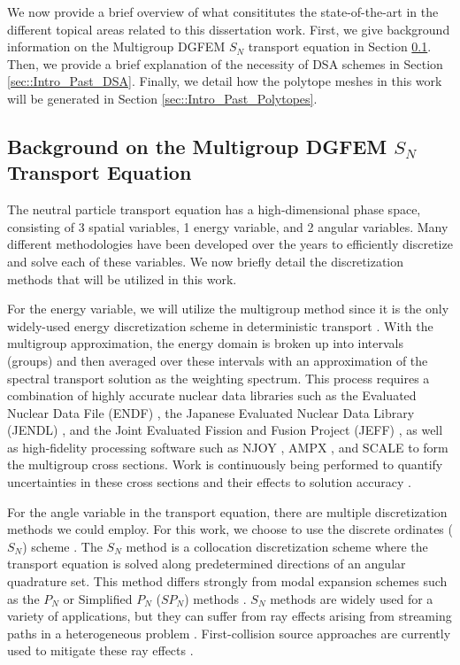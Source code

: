 We now provide a brief overview of what consititutes the state-of-the-art in the different topical areas related to this dissertation work. First, we give background information on the Multigroup DGFEM $S_N$ transport equation in Section \ref{sec::Intro_Past_DGFEMMGSn}. Then, we provide a brief explanation of the necessity of DSA schemes in Section \ref{sec::Intro_Past_DSA}. Finally, we detail how the polytope meshes in this work will be generated in Section \ref{sec::Intro_Past_Polytopes}.

\subsection{Background on the Multigroup DGFEM $S_N$ Transport Equation}
\label{sec::Intro_Past_DGFEMMGSn}

The neutral particle transport equation has a high-dimensional phase space, consisting of 3 spatial variables, 1 energy variable, and 2 angular variables. Many different methodologies have been developed over the years to efficiently discretize and solve each of these variables. We now briefly detail the discretization methods that will be utilized in this work.

For the energy variable, we will utilize the multigroup method since it is the only widely-used energy discretization scheme in deterministic transport \cite{duderstadt1976nuclear,bell1979nuclear}. With the multigroup approximation, the energy domain is broken up into intervals (groups) and then averaged over these intervals with an approximation of the spectral transport solution as the weighting spectrum. This process requires a combination of highly accurate nuclear data libraries such as the Evaluated Nuclear Data File (ENDF) \cite{chadwick2006endf,chadwick2011endf}, the Japanese Evaluated Nuclear Data Library (JENDL) \cite{shibata2002japanese}, and the Joint Evaluated Fission and Fusion Project (JEFF) \cite{koning2006jeff}, as well as high-fidelity processing software such as NJOY \cite{macfarlane2002njoy,kahler2012njoy}, AMPX \cite{dunn2002ampx}, and SCALE \cite{bucholz1982scale} to form the multigroup cross sections. Work is continuously being performed to quantify uncertainties in these cross sections and their effects to solution accuracy \cite{aliberti2006nuclear,jessee2008cross}.

For the angle variable in the transport equation, there are multiple discretization methods we could employ. For this work, we choose to use the discrete ordinates ($S_N$) scheme \cite{carlson1968computing,lewis1984computational}. The $S_N$ method is a collocation discretization scheme where the transport equation is solved along predetermined directions of an angular quadrature set. This method differs strongly from modal expansion schemes such as the $P_N$ or Simplified $P_N$ ($SP_N$) methods \cite{bell1979nuclear,gelbard1960application}. $S_N$ methods are widely used for a variety of applications, but they can suffer from ray effects arising from streaming paths in a heterogeneous problem \cite{lathrop1968ray}. First-collision source approaches are currently used to mitigate these ray effects \cite{lathrop1971remedies,morel_rayeffects}.


